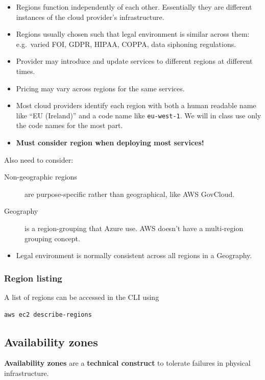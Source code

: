 \begin{itemize}
\item
  Regions function independently of each other. Essentially they are
  different instances of the cloud provider's infrastructure.
\item
  Regions usually chosen such that legal environment is similar across
  them: e.g.~varied FOI, GDPR, HIPAA, COPPA, data siphoning regulations.
\item
  Provider may introduce and update services to different regions at
  different times.
\item
  Pricing may vary across regions for the same services.
\item
  Most cloud providers identify each region with both a human readable
  name like ``EU (Ireland)'' and a code name like \texttt{eu-west-1}. We
  will in class use only the code names for the most part.
\item
  \textbf{Must consider region when deploying most services!}
\end{itemize}
Also need to consider:
\begin{description}
\item[Non-geographic regions]
are purpose-specific rather than geographical, like AWS GovCloud.
\item[Geography]
is a region-grouping that Azure use. AWS doesn't have a multi-region
grouping concept.
\end{description}
\begin{itemize}
\item
  Legal environment is normally consistent across all regions in a
  Geography.
\end{itemize}

\subsubsection{Region listing}
A list of regions can be accessed in the CLI using
\begin{verbatim}
aws ec2 describe-regions
\end{verbatim}


\subsection{Availability zones}
\label{sec:availability-zones}

\textbf{Availability zones} are a \textbf{technical construct} to tolerate failures in physical
infrastructure.

